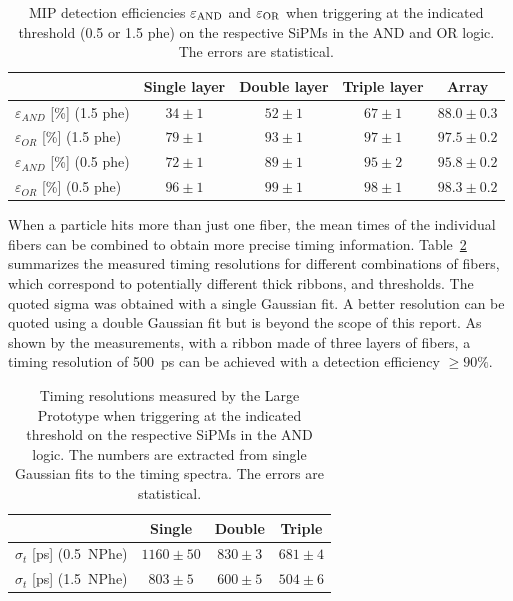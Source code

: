 \begin{refsection}
        \begin{table}
        	\begin{center}
        		\begin{tabular}{l | c | c | c | c } 
        		& Single layer & Double layer& Triple layer & Array  \\ \hline\hline
        			   $\varepsilon_{AND}$ [\%] (1.5 phe)  & $34\pm1$ & $52\pm1$ & $67\pm1$ & $88.0\pm0.3$ \\
        			  $\varepsilon_{OR}$ \hspace{0.13cm} [\%] (1.5 phe)    & $79\pm1$ & $93\pm1$ & $97\pm1$ & $97.5\pm0.2$ \\
        			   $\varepsilon_{AND}$ [\%] (0.5 phe) & $72\pm1$ & $89\pm1$ & $95\pm2$ & $95.8\pm0.2$ \\
        			   $\varepsilon_{OR}$ \hspace{0.13cm} [\%] (0.5 phe)   & $96\pm1$  & $99\pm1$ & $98\pm1$ & $98.3\pm0.2$ 
        		\end{tabular}
        	\end{center}	
        		\caption[Detection efficiencies for m.i.p.]{MIP detection efficiencies $\varepsilon_{\rm AND}$ and $\varepsilon_{\rm OR}$ when triggering at the indicated threshold (0.5 or 1.5 phe) on the respective SiPMs in the AND and OR logic. The errors are statistical.}
        		\label{tab:DetectionEff}
        \end{table}

        \noindent
        When a particle hits more than just one fiber, the mean times of the individual fibers can be combined to obtain more precise timing information. Table~\ref{tab:TimingResRibbon} summarizes the measured timing resolutions for different combinations of fibers, which correspond to potentially different thick ribbons, and thresholds. The quoted sigma was obtained with a single Gaussian fit. A better resolution can be quoted using a double Gaussian fit but is beyond the scope of this report. As shown by the measurements, with a ribbon made of three layers of fibers, a timing resolution of \SI{500}{ps} can be achieved with a detection efficiency $\geq90\%$.\\
        
        \begin{table}
        	\centering
        		\begin{tabular}{l | c | c | c }
          			  & Single & Double & Triple \\ \hline\hline
        			  $\sigma_{t}$ [ps] \hspace{0.32cm} (0.5~NPhe) & $1160\pm50$ & $830\pm3$ & $681\pm4$ \\
        			 $\sigma_{t}$ [ps] \hspace{0.32cm} (1.5~NPhe) & $803\pm5$& $600\pm5$ & $504\pm6$  \\
        		\end{tabular}
             \caption[]{Timing resolutions measured by the Large Prototype when triggering at the indicated threshold on the respective SiPMs in the AND logic. The numbers are extracted from single Gaussian fits to the timing spectra. The errors are statistical. }
        	\label{tab:TimingResRibbon}
        \end{table}


\end{refsection}
